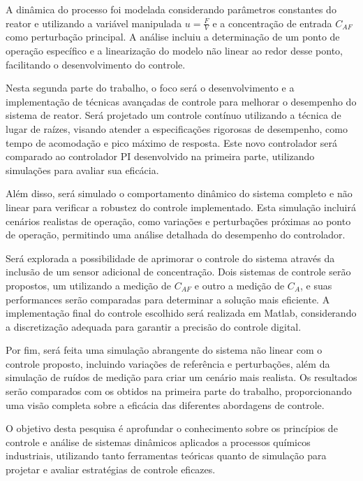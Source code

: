 \documentclass[a4paper,12pt]{article}
\begin{document}
A dinâmica do processo foi modelada considerando parâmetros constantes do reator e utilizando a variável manipulada \(u = \frac{F}{V}\) e a concentração de entrada \(C_{AF}\) como perturbação principal. A análise incluiu a determinação de um ponto de operação específico e a linearização do modelo não linear ao redor desse ponto, facilitando o desenvolvimento do controle.

Nesta segunda parte do trabalho, o foco será o desenvolvimento e a implementação de técnicas avançadas de controle para melhorar o desempenho do sistema de reator. Será projetado um controle contínuo utilizando a técnica de lugar de raízes, visando atender a especificações rigorosas de desempenho, como tempo de acomodação e pico máximo de resposta. Este novo controlador será comparado ao controlador PI desenvolvido na primeira parte, utilizando simulações para avaliar sua eficácia.

Além disso, será simulado o comportamento dinâmico do sistema completo e não linear para verificar a robustez do controle implementado. Esta simulação incluirá cenários realistas de operação, como variações e perturbações próximas ao ponto de operação, permitindo uma análise detalhada do desempenho do controlador.

Será explorada a possibilidade de aprimorar o controle do sistema através da inclusão de um sensor adicional de concentração. Dois sistemas de controle serão propostos, um utilizando a medição de \(C_{AF}\) e outro a medição de \(C_A\), e suas performances serão comparadas para determinar a solução mais eficiente. A implementação final do controle escolhido será realizada em Matlab, considerando a discretização adequada para garantir a precisão do controle digital.

Por fim, será feita uma simulação abrangente do sistema não linear com o controle proposto, incluindo variações de referência e perturbações, além da simulação de ruídos de medição para criar um cenário mais realista. Os resultados serão comparados com os obtidos na primeira parte do trabalho, proporcionando uma visão completa sobre a eficácia das diferentes abordagens de controle.

O objetivo desta pesquisa é aprofundar o conhecimento sobre os princípios de controle e análise de sistemas dinâmicos aplicados a processos químicos industriais, utilizando tanto ferramentas teóricas quanto de simulação para projetar e avaliar estratégias de controle eficazes.

\newpage
\end{document}
